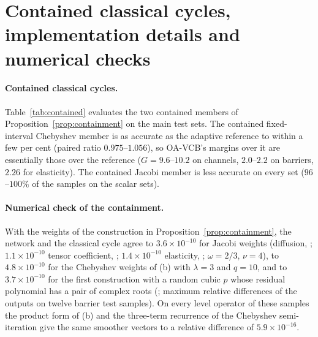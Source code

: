 \clearpage
\appendix
\section{Contained classical cycles, implementation details and numerical checks}\label{app:impl}

\paragraph{Contained classical cycles.} Table~\ref{tab:contained} evaluates the two contained members of
Proposition~\ref{prop:containment} on the main test sets. The contained fixed-interval Chebyshev member is as accurate as the
adaptive reference to within a few per cent (paired ratio $0.975$--$1.056$), so OA-VCB's margins over it are essentially those
over the reference ($G = 9.6$--$10.2$ on channels, $2.0$--$2.2$ on barriers, $2.26$ for elasticity). The contained Jacobi member
is less accurate on every set ($96$--$100\%$ of the samples on the scalar sets).

\paragraph{Numerical check of the containment.} With the weights of the construction in Proposition~\ref{prop:containment},
the network and the classical cycle agree to $3.6\times10^{-10}$ for Jacobi weights (diffusion, ;
$1.1\times10^{-10}$ tensor coefficient, ; $1.4\times10^{-10}$ elasticity,
; $\omega = 2/3$, $\nu = 4$), to $4.8\times10^{-10}$ for the Chebyshev weights of (b)
with $\lambda = 3$ and $q = 10$, and to $3.7\times10^{-10}$ for the first construction with a random cubic $p$ whose residual
polynomial has a pair of complex roots (; maximum relative differences of the
outputs on twelve barrier test samples). On every level operator of these samples the product form of (b) and the three-term
recurrence of the Chebyshev semi-iteration give the same smoother vectors to a relative difference of $5.9\times10^{-16}$.

